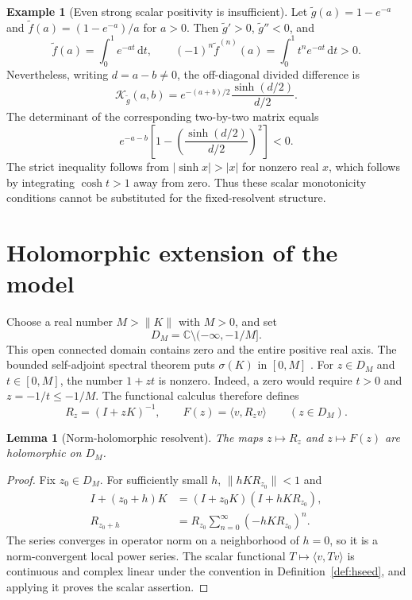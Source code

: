 \documentclass[11pt,a4paper]{article}
\numberwithin{equation}{section}
\newtheorem{lemma}[theorem]{Lemma}
\theoremstyle{definition}
\newtheorem{example}[theorem]{Example}
\theoremstyle{remark}
\newcommand{\C}{\mathbb C}
\newcommand{\ip}[2]{\langle #1,#2\rangle}
\newcommand{\norm}[1]{\lVert #1\rVert}
\newcommand{\dd}{\,\mathrm d}
\begin{document}
\begin{example}[Even strong scalar positivity is insufficient]\label{ex:scalar}
Let $\widetilde g(a)=1-e^{-a}$ and
$\widetilde f(a)=(1-e^{-a})/a$ for $a>0$.
Then $\widetilde g'>0$, $\widetilde g''<0$, and
\[
\widetilde f(a)=\int_0^1 e^{-at}\dd t,\qquad
(-1)^n\widetilde f^{(n)}(a)=\int_0^1t^ne^{-at}\dd t>0.
\]
Nevertheless, writing $d=a-b\ne0$, the off-diagonal divided difference is
\[
\mathcal K_{\widetilde g}(a,b)
=e^{-(a+b)/2}\frac{\sinh(d/2)}{d/2}.
\]
The determinant of the corresponding two-by-two matrix equals
\begin{equation}\label{eq:counterexample-det}
e^{-a-b}\left[1-
\left(\frac{\sinh(d/2)}{d/2}\right)^2\right]<0.
\end{equation}
The strict inequality follows from $|\sinh x|>|x|$ for nonzero real $x$,
which follows by integrating $\cosh t>1$ away from zero.
Thus these scalar monotonicity conditions cannot be substituted for the
fixed-resolvent structure.
\end{example}

\section[Holomorphic model]{Holomorphic extension of the model}\label{sec:analytic}

Choose a real number $M>\norm K$ with $M>0$, and set
\begin{equation}\label{eq:domain}
D_M=\C\setminus(-\infty,-1/M].
\end{equation}
This open connected domain contains zero and the entire positive real
axis. The bounded self-adjoint spectral theorem puts $\sigma(K)$ in
$[0,M]$ \cite{williams}. For $z\in D_M$ and $t\in[0,M]$, the number
$1+zt$ is nonzero. Indeed, a zero would require $t>0$ and
$z=-1/t\leq-1/M$. The functional calculus therefore defines
\begin{equation}\label{eq:complex-model}
R_z=(I+zK)^{-1},\qquad F(z)=\ip v{R_zv}\qquad(z\in D_M).
\end{equation}

\begin{lemma}[Norm-holomorphic resolvent]\label{lem:holomorphic}
The maps $z\mapsto R_z$ and $z\mapsto F(z)$ are holomorphic on $D_M$.
\end{lemma}
\begin{proof}
Fix $z_0\in D_M$. For sufficiently small $h$,
$\norm{hKR_{z_0}}<1$ and
\begin{align*}
I+(z_0+h)K&=(I+z_0K)(I+hKR_{z_0}),\\
R_{z_0+h}&=R_{z_0}\sum_{n=0}^{\infty}(-hKR_{z_0})^n.
\end{align*}
The series converges in operator norm on a neighborhood of $h=0$, so
it is a norm-convergent local power series. The scalar functional
$T\mapsto\ip v{Tv}$ is continuous and complex linear under the convention
in Definition~\ref{def:hseed}, and applying it proves the scalar assertion.
\end{proof}
\end{document}
